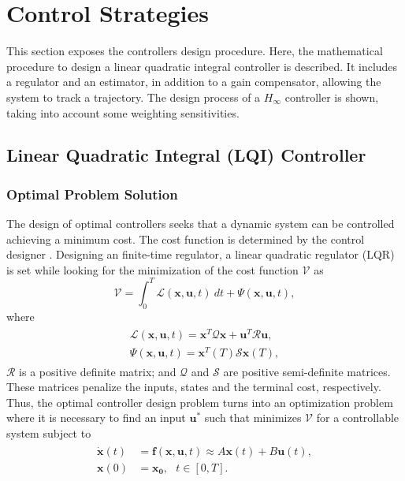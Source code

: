 \section{Control Strategies}
\label{sec:controlstrategies}
This section exposes the controllers design procedure. Here, the mathematical procedure to design a linear quadratic integral controller is described. It includes a regulator and an estimator, in addition to a gain compensator, allowing the system to track a trajectory. The design process of a $H_{\infty}$ controller is shown, taking into account some weighting sensitivities.

\subsection{Linear Quadratic Integral (LQI) Controller}
\subsubsection{Optimal Problem Solution}
The design of optimal controllers seeks that a dynamic system can be controlled achieving a minimum cost. The cost function is determined by the control designer \cite{Steinbuch2007}. Designing an finite-time regulator, a linear quadratic regulator (LQR) is set while looking for the minimization of the cost function $\mathcal{V}$ as
\begin{equation}
\label{eqn:cost}
\mathcal{V} = \int_{0}^{T}\mathcal{L}(\mathbf{x},\mathbf{u},t)\ dt + \Psi(\mathbf{x},\mathbf{u},t),
\end{equation}
where
\begin{align}
\begin{split}
\mathcal{L}(\mathbf{x},\mathbf{u},t) = \mathbf{x}^{T}\mathcal{Q}\mathbf{x} + \mathbf{u}^{T}\mathcal{R}\mathbf{u},\\[5px]
\Psi(\mathbf{x},\mathbf{u},t) = \mathbf{x}^{T}(T)\mathcal{S}\mathbf{x}(T),
\end{split}
\end{align}
$\mathcal{R}$ is a positive definite matrix; and $\mathcal{Q}$ and $\mathcal{S}$ are positive semi-definite matrices. These matrices penalize the inputs, states and the terminal cost, respectively. Thus, the optimal controller design problem turns into an optimization problem where it is necessary to find an input $\mathbf{u}^{*}$ such that minimizes $\mathcal{V}$ for a controllable system subject to
\begin{align}
\begin{split}
\dot{\mathbf{x}}(t) & = \mathbf{f}(\mathbf{x}, \mathbf{u}, t) \approx A\mathbf{x}(t)+B\mathbf{u}(t),\\[5px]
\mathbf{x}(0) & = \mathbf{x_0},\ \ \ t \in [0, T].
\end{split}
\end{align}
